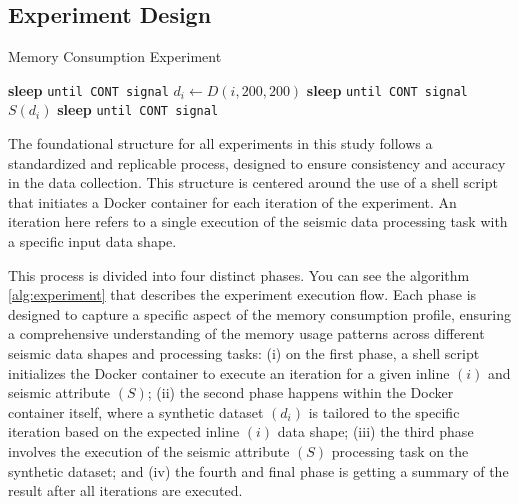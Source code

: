 \subsection{Experiment Design}
\label{subsec:experiment-design}

\begin{algorithm}
    \caption{Memory Consumption Experiment}\label{alg:experiment}
    \begin{algorithmic}[1]
        \State \textbf{sleep} \texttt{until CONT signal}
        \State \texttt{$d_{i} \gets D(i, 200, 200)$}
        \State \textbf{sleep} \texttt{until CONT signal}
        \State \texttt{$S(d_{i})$}
        \State \textbf{sleep} \texttt{until CONT signal}
        \EndFor
        \EndProcedure
    \end{algorithmic}
\end{algorithm}

The foundational structure for all experiments in this study follows a standardized and replicable process, designed to ensure consistency and accuracy in the data collection.
This structure is centered around the use of a shell script that initiates a Docker container for each iteration of the experiment.
An iteration here refers to a single execution of the seismic data processing task with a specific input data shape.

This process is divided into four distinct phases.
You can see the algorithm \ref{alg:experiment} that describes the experiment execution flow.
Each phase is designed to capture a specific aspect of the memory consumption profile, ensuring a comprehensive understanding of the memory usage patterns across different seismic data shapes and processing tasks:
(i) on the first phase, a shell script initializes the Docker container to execute an iteration for a given inline $(i)$ and seismic attribute $(S)$;
(ii) the second phase happens within the Docker container itself, where a synthetic dataset $(d_{i})$ is tailored to the specific iteration based on the expected inline $(i)$ data shape;
(iii) the third phase involves the execution of the seismic attribute $(S)$ processing task on the synthetic dataset; and
(iv) the fourth and final phase is getting a summary of the result after all iterations are executed.


